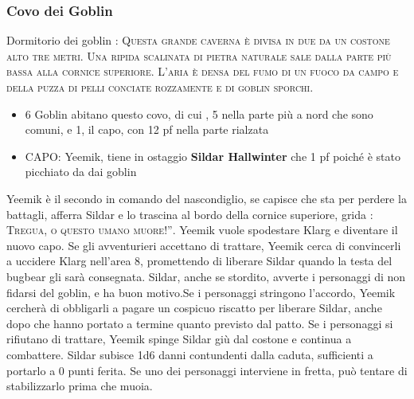 \documentclass{article}
\begin{document}
\subsubsection{Covo dei Goblin}
Dormitorio dei goblin : \textsc{Questa grande caverna è divisa in due da un costone alto tre
metri. Una ripida scalinata di pietra naturale sale dalla parte
più bassa alla cornice superiore. L'aria è densa del fumo di un
fuoco da campo e della puzza di pelli conciate rozzamente e di
goblin sporchi.}
\begin{itemize}
    \item 6 Goblin abitano questo covo, di cui , 5 nella parte più a nord che sono comuni, e 1, il capo, con 12 pf nella parte rialzata
    \item CAPO: Yeemik, tiene in ostaggio \textbf{Sildar Hallwinter} che 1 pf poiché è stato picchiato da dai goblin
\end{itemize}

Yeemik è il secondo in comando del nascondiglio, se capisce che sta per perdere la battagli, afferra Sildar e lo trascina al bordo della cornice superiore, grida : \textsc{Tregua, o questo
umano muore!”}.
Yeemik vuole spodestare Klarg e diventare il nuovo capo.
Se gli avventurieri accettano di trattare, Yeemik cerca
di convincerli a uccidere Klarg nell’area 8, promettendo
di liberare Sildar quando la testa del bugbear gli sarà
consegnata. Sildar, anche se stordito, avverte i personaggi
di non fidarsi del goblin, e ha buon motivo.Se i personaggi
stringono l'accordo, Yeemik cercherà di obbligarli a pagare un cospicuo riscatto per liberare Sildar, anche dopo che hanno
portato a termine quanto previsto dal patto.
Se i personaggi si rifiutano di trattare, Yeemik spinge
Sildar giù dal costone e continua a combattere. Sildar subisce
1d6 danni contundenti dalla caduta, sufficienti a portarlo
a 0 punti ferita. Se uno dei personaggi interviene in fretta,
può tentare di stabilizzarlo prima che muoia. \newline
\end{document}
